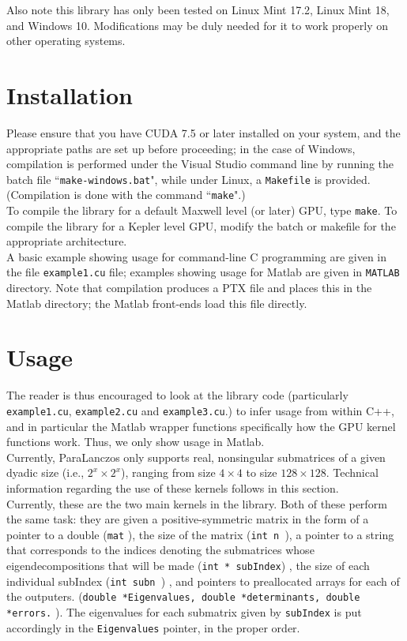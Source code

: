\documentclass{amsart}
\begin{document}
 Also note this library has only been tested on Linux Mint 17.2, Linux Mint 18, and Windows 10.    Modifications may be duly needed for it to work properly on other operating systems.

\section{Installation}

Please ensure that you have CUDA 7.5 or later installed on your system, and the appropriate paths are set up before proceeding;  in the case of Windows, compilation is performed under the Visual Studio command line by running the batch file ``{\tt make-windows.bat}", while under Linux, a {\tt Makefile} is provided.  (Compilation is done with the command ``{\tt make}".) \\

To compile the library for a default Maxwell level (or later) GPU, type {\tt make}.  To compile the library for a Kepler level GPU, modify the batch or makefile for the appropriate architecture.  \\

A basic example showing usage for command-line C programming are given in the file {\tt example1.cu} file;  examples showing usage for Matlab are given in {\tt MATLAB} directory.  Note that compilation produces a PTX file and places this in the Matlab directory;  the Matlab front-ends load this file directly.

\section{Usage}

The reader is thus encouraged to look at the library code (particularly {\tt example1.cu},  {\tt example2.cu} and {\tt example3.cu}.) to infer usage from within C++, and in particular the Matlab wrapper functions specifically how the GPU kernel functions work. Thus, we only show usage in Matlab.\\

Currently, ParaLanczos only supports real, nonsingular submatrices of a given dyadic size (i.e., $2^x \times 2^x$), ranging from size $4 \times 4$ to size $128 \times 128$.  Technical information regarding the use of these kernels follows in this section.\\

Currently, these are the two main kernels in the library.  Both of these perform the same task:  they are given a positive-symmetric matrix in the form of a pointer to a double ({\tt * mat} ), the size of the matrix ({\tt int n }), a pointer to a string that corresponds to the indices denoting the submatrices whose eigendecompositions that will be made ({\tt int * subIndex}) , the size of each individual subIndex ({\tt int subn }) , and pointers to preallocated arrays for each of the outputers.  ({\tt double *Eigenvalues, double *determinants, double *errors.} ).  The eigenvalues for each submatrix given by {\tt subIndex} is put accordingly in the {\tt Eigenvalues} pointer, in the proper order.  \\
\end{document}
